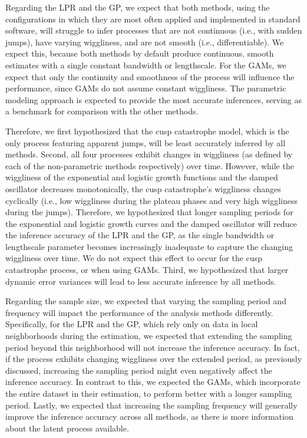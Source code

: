 \documentclass[man, floatsintext]{apa7}
\begin{document}
Regarding the LPR and the GP, we expect that both methods, using the
configurations in which they are most often applied and implemented in standard
software, will struggle to infer processes that are not continuous (i.e., with
sudden jumps), have varying wiggliness, and are not smooth (i.e.,
differentiable). We expect this, because both methods by default produce
continuous, smooth estimates with a single constant bandwidth or lengthscale.
For the GAMs, we expect that only the continuity and smoothness of the process
will influence the performance, since GAMs do not assume constant wiggliness.
The parametric modeling approach is expected to provide the most accurate
inferences, serving as a benchmark for comparison with the other methods.

Therefore, we first hypothesized that the cusp catastrophe model, which is the
only process featuring apparent jumps, will be least accurately inferred by all
methods. Second, all four processes exhibit changes in wiggliness (as defined
by each of the non-parametric methods respectively) over time. However, while
the wiggliness of the exponential and logistic growth functions and the damped
oscillator decreases monotonically, the cusp catastrophe's wiggliness changes
cyclically (i.e., low wiggliness during the plateau phases and very high
wiggliness during the jumps). Therefore, we hypothesized that longer sampling
periods for the exponential and logistic growth curves and the damped
oscillator will reduce the inference accuracy of the LPR and the GP, as the
single bandwidth or lengthscale parameter becomes increasingly inadequate to
capture the changing wiggliness over time. We do not expect this effect to
occur for the cusp catastrophe process, or when using GAMs. Third, we
hypothesized that larger dynamic error variances will lead to less accurate
inference by all methods.

Regarding the sample size, we expected that varying the sampling period and
frequency will impact the performance of the analysis methods differently.
Specifically, for the LPR and the GP, which rely only on data in local
neighborhoods during the estimation, we expected that extending the sampling
period beyond this neighborhood will not increase the inference accuracy. In
fact, if the process exhibits changing wiggliness over the extended period, as
previously discussed, increasing the sampling period might even negatively
affect the inference accuracy. In contrast to this, we expected the GAMs, which
incorporate the entire dataset in their estimation, to perform better with a
longer sampling period. Lastly, we expected that increasing the sampling
frequency will generally improve the inference accuracy across all methods, as
there is more information about the latent process available.
\end{document}
